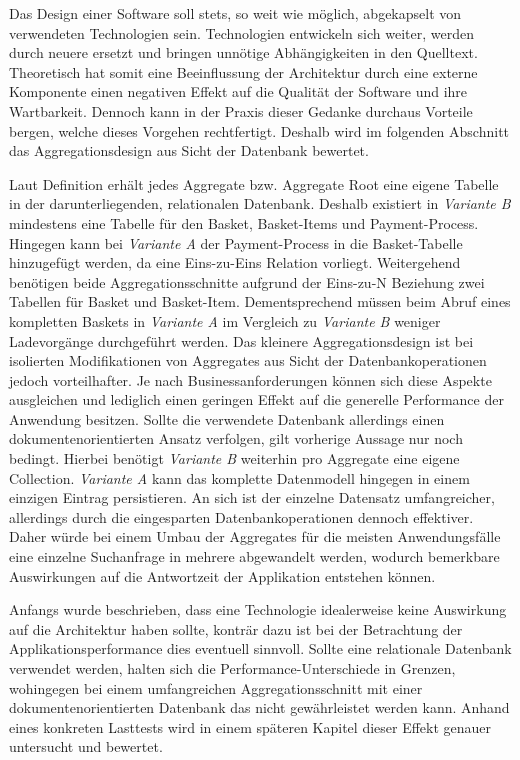 Das Design einer Software soll stets, so weit wie möglich, abgekapselt von verwendeten Technologien sein. Technologien entwickeln sich weiter, werden durch neuere ersetzt und bringen unnötige Abhängigkeiten in den Quelltext. Theoretisch hat somit eine Beeinflussung der Architektur durch eine externe Komponente einen negativen Effekt auf die Qualität der Software und ihre Wartbarkeit. Dennoch kann in der Praxis dieser Gedanke durchaus Vorteile bergen, welche dieses Vorgehen rechtfertigt. Deshalb wird im folgenden Abschnitt das Aggregationsdesign aus Sicht der Datenbank bewertet.

Laut Definition erhält jedes Aggregate bzw. Aggregate Root eine eigene Tabelle in der darunterliegenden, relationalen Datenbank. Deshalb existiert in \emph{Variante B} mindestens eine Tabelle für den Basket, Basket-Items und Payment-Process. Hingegen kann bei \emph{Variante A} der Payment-Process in die Basket-Tabelle hinzugefügt werden, da eine Eins-zu-Eins Relation vorliegt. Weitergehend benötigen beide Aggregationsschnitte aufgrund der Eins-zu-N Beziehung zwei Tabellen für Basket und Basket-Item. Dementsprechend müssen beim Abruf eines kompletten Baskets in \emph{Variante A} im Vergleich zu \emph{Variante B} weniger Ladevorgänge durchgeführt werden. Das kleinere Aggregationsdesign ist bei isolierten Modifikationen von Aggregates aus Sicht der Datenbankoperationen jedoch vorteilhafter. Je nach Businessanforderungen können sich diese Aspekte ausgleichen und lediglich einen geringen Effekt auf die generelle Performance der Anwendung besitzen. Sollte die verwendete Datenbank allerdings einen dokumentenorientierten Ansatz verfolgen, gilt vorherige Aussage nur noch bedingt. Hierbei benötigt \emph{Variante B} weiterhin pro Aggregate eine eigene \gls{Collection}. \emph{Variante A} kann das komplette Datenmodell hingegen in einem einzigen Eintrag persistieren. An sich ist der einzelne Datensatz umfangreicher, allerdings durch die eingesparten Datenbankoperationen dennoch effektiver. Daher würde bei einem Umbau der Aggregates für die meisten Anwendungsfälle eine einzelne Suchanfrage in mehrere abgewandelt werden, wodurch bemerkbare Auswirkungen auf die Antwortzeit der Applikation entstehen können. 

Anfangs wurde beschrieben, dass eine Technologie idealerweise keine Auswirkung auf die Architektur haben sollte, konträr dazu ist bei der Betrachtung der Applikationsperformance dies eventuell sinnvoll. Sollte eine relationale Datenbank verwendet werden, halten sich die Performance-Unterschiede in Grenzen, wohingegen bei einem umfangreichen Aggregationsschnitt mit einer dokumentenorientierten Datenbank das nicht gewährleistet werden kann. Anhand eines konkreten Lasttests wird in einem späteren Kapitel dieser Effekt genauer untersucht und bewertet.


